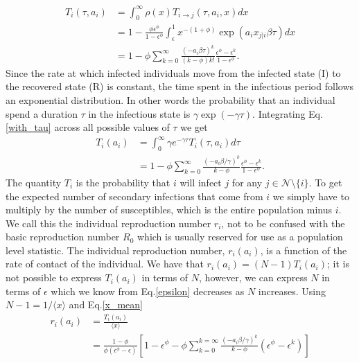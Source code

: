 \documentclass[10pt]{article}
\begin{document}
\begin{multicols}{2}
\begin{equation}
\label{with_tau}
\begin{split}
T_{i}(\tau,a_{i})&=\int_{0}^{\infty}\rho(x)T_{i\rightarrow j}(\tau,a_{i},x)dx\\
&=1-\frac{\phi\epsilon^{\phi}}{1-\epsilon^{\phi}}\int_{\epsilon}^{1}x^{-(1+\phi)}\exp(a_{i}x_{j|i}\beta\tau)dx\\
&=1-\phi\sum_{k=0}^{\infty}\frac{(-a_{i}\beta\tau)^{k}}{(k-\phi)k!}\frac{\epsilon^{\phi}-\epsilon^{k}}{1-\epsilon^{\phi}}.
\end{split}
\end{equation}
Since the rate at which infected individuals move from the infected state (I) to the recovered state (R) is constant, the time spent in the infectious period follows an exponential distribution. In other words the probability that an individual spend a duration $\tau$ in the infectious state is $\gamma\exp(-\gamma\tau)$. Integrating Eq.\eqref{with_tau} across all possible values of $\tau$ we get
\begin{equation}
\label{without_tau}
\begin{split}
T_{i}(a_{i})&=\int_{0}^{\infty}\gamma e^{-\gamma\tau}T_{i}(\tau,a_{i})d\tau\\
&=1-\phi\sum_{k=0}^{\infty}\frac{(-a_{i}\beta/\gamma)^{k}}{k-\phi}\frac{\epsilon^{\phi}-\epsilon^{k}}{1-\epsilon^{\phi}}.
\end{split}
\end{equation}
The quantity $T_{i}$ is the probability that $i$ will infect $j$ for any $j\in\mathcal{N}\setminus\{i\}$. To get the expected number of secondary infections that come from $i$ we simply have to multiply by the number of susceptibles, which is the entire population minus $i$. We call this the individual reproduction number $r_{i}$, not to be confused with the basic reproduction number $R_{0}$ which is usually reserved for use as a population level statistic. The individual reproduction number, $r_{i}(a_{i})$, is a function of the rate of contact of the individual. We have that $r_{i}(a_{i})=(N-1)T_{i}(a_{i})$; it is not possible to express $T_{i}(a_{i})$ in terms of $N$, however, we can express $N$ in terms of $\epsilon$ which we know from Eq.\eqref{epsilon} decreases as $N$ increases. Using $N-1=1/\langle x \rangle$ and Eq.\eqref{x_mean}
\begin{equation}
\label{r_i}
\begin{split}
r_{i}(a_{i})&=\frac{T_{i}(a_{i})}{\langle x \rangle}\\
&=\frac{1-\phi}{\phi(\epsilon^{\phi}-\epsilon)}\left[1-\epsilon^{\phi}-\phi\sum_{k=0}^{k=\infty}\frac{(-a_{i}\beta/\gamma)^{k}}{k-\phi}(\epsilon^{\phi}-\epsilon^{k})\right]

\end{split}
\end{equation}
\end{multicols}
\end{document}
